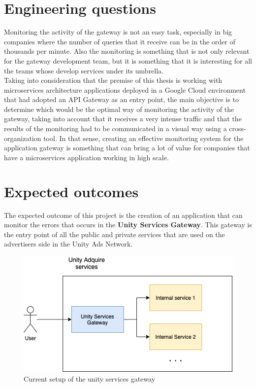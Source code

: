 \documentclass[12pt]{article}
\begin{document}
\section{Engineering questions}

Monitoring the activity of the gateway is not an easy task, especially in big companies where the number of queries that it receive can be in the order of thousands per minute. Also the monitoring is something that is not only relevant for the gateway development team, but it is something that it is interesting for all the teams whose develop services under its umbrella.\\

Taking into consideration that the premise of this thesis is working with microservices architecture applications deployed in a Google Cloud environment that had adopted an API Gateway as an entry point, the main objective is to determine which would be the optimal way of monitoring the activity of the gateway, taking into account that it receives a very intense traffic and that the results of the monitoring had to be communicated in a visual way using a cross-organization tool. In that sense, creating an effective monitoring system for the application gateway is something that can bring a lot of value for companies that have a microservices application working in high scale.\\

\section{Expected outcomes}

The expected outcome of this project is the creation of an application that can monitor the errors that occurs in the \textbf{Unity Services Gateway}. This gateway is the entry point of all the public and private services that are used on the advertisers side in the Unity Ads Network.\\

\begin{figure}
    \centering
    \includegraphics[scale=0.4]{src/proposal/img/diagram-1.png}
    \caption{Current setup of the unity services gateway}
    \label{fig:my_label}
\end{figure}
\end{document}
